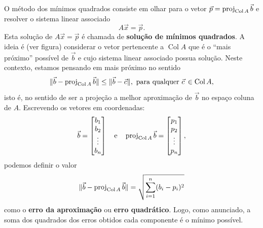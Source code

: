 O método dos mínimos quadrados consiste em olhar para o vetor $\vec{p} = \operatorname{proj}_{\operatorname{Col} A} \vec{b}$ e resolver o sistema linear associado
\begin{equation}
A \vec{x} = \vec{p}.
\end{equation} Esta solução de $A \vec{x} = \vec{p}$ é chamada de \textbf{solução de mínimos quadrados}. A ideia é (ver figura) considerar o vetor pertencente a $\operatorname{Col} A$ que é o ``mais próximo'' possível de $\vec{b}$ e cujo sistema linear associado possua solução. Neste contexto, estamos pensando em mais próximo no sentido 
\begin{equation}
\| \vec{b} - \operatorname{proj}_{\operatorname{Col} A} \vec{b} \| \le \| \vec{b} - \vec{c} \|, \text{ para qualquer } \vec{c}\, \in \operatorname{Col} A,
\end{equation} isto é, no sentido de ser a projeção a melhor aproximação de $\vec{b}$ no espaço coluna de $A$. Escrevendo os vetores em coordenadas:
\begin{equation}
\vec{b} =
\begin{bmatrix}
  b_1 \\ b_2 \\ \vdots \\ b_n
\end{bmatrix} \quad \text{e} \quad 
\operatorname{proj}_{\operatorname{Col} A} \vec{b} =
\begin{bmatrix}
  p_1 \\ p_2 \\ \vdots \\ p_n
\end{bmatrix},
\end{equation} podemos definir o valor
\begin{equation}
\| \vec{b} - \operatorname{proj}_{\operatorname{Col} A} \vec{b} \| = \sqrt{\sum_{i=1}^n (b_i - p_i)^2}
\end{equation} como o \textbf{erro da aproximação} ou \textbf{erro  quadrático}. Logo, como anunciado, a soma dos quadrados dos erros obtidos cada componente é o mínimo possível.


